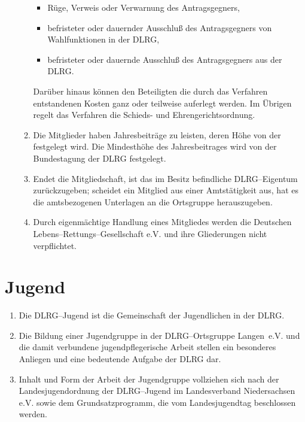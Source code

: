 \documentclass[%
12pt, %
a4paper, %
headsepline, %
footsepline, %
parskip, %
headings=normal, %
]{scrartcl}
\begin{document}
\begin{enumerate}
\begin{enumerate}[noitemsep]
\begin{itemize}
            \item Rüge, Verweis oder Verwarnung des Antragsgegners,
            \item befristeter oder dauernder Ausschluß des Antragsgegners von Wahlfunktionen in der DLRG,
            \item befristeter oder dauernde Ausschluß des Antragsgegners aus der DLRG.
        \end{itemize}
        Darüber hinaus können den Beteiligten die durch das Verfahren entstandenen Kosten ganz oder teilweise auferlegt werden. Im Übrigen regelt das Verfahren die Schieds- und Ehrengerichtsordnung.
        \item Die Mitglieder haben Jahresbeiträge zu leisten, deren Höhe von der  festgelegt wird. Die Mindesthöhe des Jahresbeitrages wird von der Bundestagung der DLRG festgelegt.
        \item Endet die Mitgliedschaft, ist das im Besitz befindliche DLRG--Eigentum zurückzugeben; scheidet ein Mitglied aus einer Amtstätigkeit aus, hat es die amtsbezogenen Unterlagen an die Ortsgruppe herauszugeben.
        \item Durch eigenmächtige Handlung eines Mitgliedes werden die Deutschen Lebens--Rettungs--Gesellschaft e.V. und ihre Gliederungen nicht verpflichtet.

    \end{enumerate}
\end{enumerate}

\section{Jugend}
\label{sec:jugend}
\begin{enumerate}
    \item Die DLRG--Jugend ist die Gemeinschaft der Jugendlichen in der DLRG.
    \item Die Bildung einer Jugendgruppe in der DLRG--Ortsgruppe Langen~e.V. und die damit verbundene jugendpflegerische Arbeit stellen ein besonderes Anliegen und eine bedeutende Aufgabe der DLRG dar.
    \item Inhalt und Form der Arbeit der Jugendgruppe vollziehen sich nach der Landesjugendordnung der DLRG--Jugend im Landesverband Niedersachsen e.V. sowie dem Grundsatzprogramm, die vom Landesjugendtag beschlossen werden.
\end{enumerate}
\end{document}
